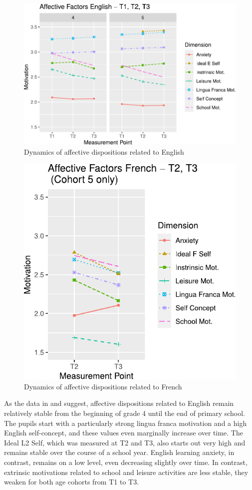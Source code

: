 \documentclass[output=paper]{langsci/langscibook}
\begin{document}
\begin{figure}[p]
\includegraphics[width=\textwidth]{figures/Fig8.1.pdf}
\caption{Dynamics of affective dispositions related to English\label{fig:08:1}}
\end{figure}

\begin{figure}[p]
\includegraphics[width=.5\textwidth]{figures/Fig8.2.pdf}
\caption{Dynamics of affective dispositions related to French\label{fig:08:2}}
\end{figure}

As the data in   and  suggest, affective dispositions related to English remain relatively stable from the beginning of grade 4 until the end of primary school. The pupils start with a particularly strong lingua franca motivation and a high English self-concept, and these values even marginally increase over time. The Ideal L2 Self, which was measured at T2 and T3, also starts out very high and remains stable over the course of a school year. English learning anxiety, in contrast, remains on a low level, even decreasing slightly over time. In contrast, extrinsic motivations related to school and leisure activities are less stable, they weaken for both age cohorts from T1 to T3.
\end{document}
